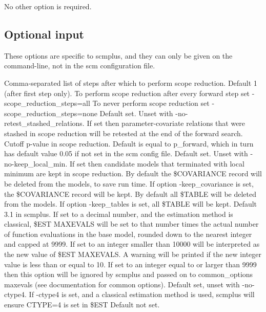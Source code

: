 \documentclass[hideglossary,notoc,hidelof,hidelot,hideTheSignaturePage,hideLinkCurrent,hideloa,pdfLatex,noClient,notitle,hideConfidential]{PMXstyle-20190820}
\newcommand{\maxevals}{3.1\xspace}
\begin{document}
No other option is required.

\subsection{Optional input}
These options are specific to scmplus, and they can only be given on the command-line, not in the
scm configuration file.

\begin{optionlist}
Comma-separated list of steps after which to perform scope reduction. Default 1 (after first step only).
To perform scope reduction after every forward step set -scope\_reduction\_steps=all 
To never perform scope reduction set -scope\_reduction\_steps=none 
\nextopt
{}
Default set. Unset with -no-retest\_stashed\_relations.
If set then parameter-covariate relations that were stashed
in scope reduction will be retested at the end of the forward search.
\nextopt
{}
Cutoff p-value in scope reduction. Default is equal to p\_forward,
which in turn has default value 0.05 if not set in the scm config file.
\nextopt
{}
Default set. Unset with -no-keep\_local\_min. If set then candidate models that
terminated with local minimum are kept in scope reduction.
By default the \$COVARIANCE record will be deleted from the models, to save run time.
If option -keep\_covariance is set, the \$COVARIANCE record will be kept.
\nextopt
{}
By default all \$TABLE will be deleted from the models.
If option -keep\_tables is set, all \$TABLE will be kept.
\nextopt
{}
Default \maxevals in scmplus. 
If set to a decimal number, and the estimation method is classical,
\$EST MAXEVALS will be set to that number times 
the actual number of function evaluations in the base model,
rounded down to the nearest integer and capped at 9999. 
If set to an integer smaller than 10000 will be interpreted as the new value
of \$EST MAXEVALS. A warning will be printed if the new integer value is 
less than or equal to 10. 
If set to an integer equal to or larger than 9999 then this option
will be ignored by scmplus and passed on to common\_options maxevals
(see documentation for common options).
Default set, unset with -no-ctype4.
If -ctype4 is set, and a classical estimation method is used,
scmplus will ensure CTYPE=4 is set in \$EST
\nextopt
{}
Default not set.

\end{optionlist}
\end{document}
